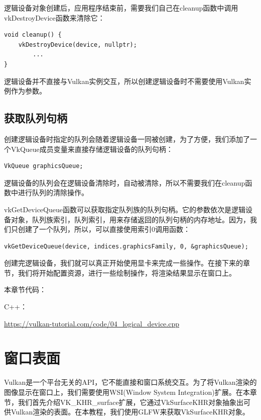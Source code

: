 \documentclass{ctexart}
\begin{document}
逻辑设备对象创建后，应用程序结束前，需要我们自己在cleanup函数中调用vkDestroyDevice函数来清除它：

\begin{lstlisting}[language={[ANSI]C}]
void cleanup() {
	vkDestroyDevice(device, nullptr);
		...
}
\end{lstlisting}

逻辑设备并不直接与Vulkan实例交互，所以创建逻辑设备时不需要使用Vulkan实例作为参数。

\subsection{获取队列句柄}

创建逻辑设备时指定的队列会随着逻辑设备一同被创建，为了方便，我们添加了一个VkQueue成员变量来直接存储逻辑设备的队列句柄：

\begin{lstlisting}[language={[ANSI]C}]
VkQueue graphicsQueue;
\end{lstlisting}

逻辑设备的队列会在逻辑设备清除时，自动被清除，所以不需要我们在cleanup函数中进行队列的清除操作。

vkGetDeviceQueue函数可以获取指定队列族的队列句柄。它的参数依次是逻辑设备对象，队列族索引，队列索引，用来存储返回的队列句柄的内存地址。因为，我们只创建了一个队列，所以，可以直接使用索引0调用函数：

\begin{lstlisting}[language={[ANSI]C}]
vkGetDeviceQueue(device, indices.graphicsFamily, 0, &graphicsQueue);
\end{lstlisting}

创建完逻辑设备，我们就可以真正开始使用显卡来完成一些操作。在接下来的章节，我们将开始配置资源，进行一些绘制操作，将渲染结果显示在窗口上。

本章节代码：

C++：

\url{https://vulkan-tutorial.com/code/04_logical_device.cpp}

\newpage
\section{窗口表面}

Vulkan是一个平台无关的API，它不能直接和窗口系统交互。为了将Vulkan渲染的图像显示在窗口上，我们需要使用WSI(Window System Integration)扩展。在本章节，我们首先介绍VK\_KHR\_surface扩展，它通过VkSurfaceKHR对象抽象出可供Vulkan渲染的表面。在本教程，我们使用GLFW来获取VkSurfaceKHR对象。
\end{document}
